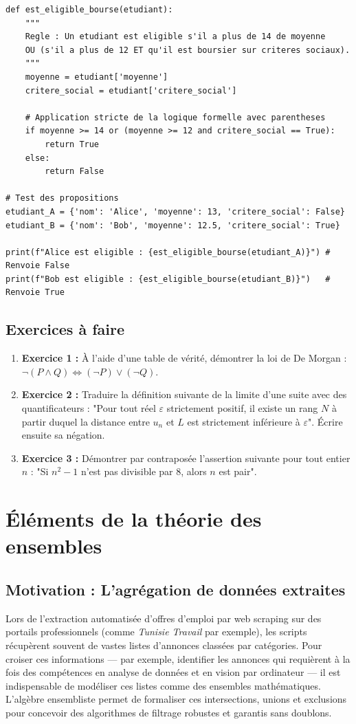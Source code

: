\begin{lstlisting}
def est_eligible_bourse(etudiant):
    """
    Regle : Un etudiant est eligible s'il a plus de 14 de moyenne 
    OU (s'il a plus de 12 ET qu'il est boursier sur criteres sociaux).
    """
    moyenne = etudiant['moyenne']
    critere_social = etudiant['critere_social']
    
    # Application stricte de la logique formelle avec parentheses
    if moyenne >= 14 or (moyenne >= 12 and critere_social == True):
        return True
    else:
        return False

# Test des propositions
etudiant_A = {'nom': 'Alice', 'moyenne': 13, 'critere_social': False}
etudiant_B = {'nom': 'Bob', 'moyenne': 12.5, 'critere_social': True}

print(f"Alice est eligible : {est_eligible_bourse(etudiant_A)}") # Renvoie False
print(f"Bob est eligible : {est_eligible_bourse(etudiant_B)}")   # Renvoie True
\end{lstlisting}

\subsection{Exercices à faire}
\begin{enumerate}
    \item \textbf{Exercice 1 :} À l'aide d'une table de vérité, démontrer la loi de De Morgan : $\neg(P \land Q) \iff (\neg P) \lor (\neg Q)$.
    \item \textbf{Exercice 2 :} Traduire la définition suivante de la limite d'une suite avec des quantificateurs : "Pour tout réel $\varepsilon$ strictement positif, il existe un rang $N$ à partir duquel la distance entre $u_n$ et $L$ est strictement inférieure à $\varepsilon$". Écrire ensuite sa négation.
    \item \textbf{Exercice 3 :} Démontrer par contraposée l'assertion suivante pour tout entier $n$ : "Si $n^2 - 1$ n'est pas divisible par $8$, alors $n$ est pair".
\end{enumerate}

\section{Éléments de la théorie des ensembles}

\subsection{Motivation : L'agrégation de données extraites}
Lors de l'extraction automatisée d'offres d'emploi par web scraping sur des portails professionnels (comme \textit{Tunisie Travail} par exemple), les scripts récupèrent souvent de vastes listes d'annonces classées par catégories. Pour croiser ces informations — par exemple, identifier les annonces qui requièrent à la fois des compétences en analyse de données et en vision par ordinateur — il est indispensable de modéliser ces listes comme des ensembles mathématiques. L'algèbre ensembliste permet de formaliser ces intersections, unions et exclusions pour concevoir des algorithmes de filtrage robustes et garantis sans doublons.

